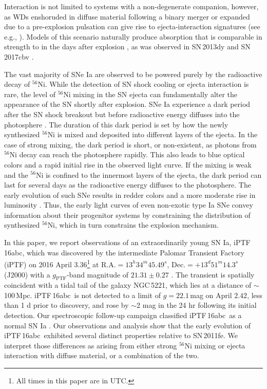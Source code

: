 \documentclass[twocolumn]{aastex61}
\newcommand{\abc}{iPTF\,16abc}
\begin{document}
Interaction is not limited to systems with a non-degenerate companion, however, as WDs enshoruded in diffuse material following a binary merger or expanded due to a pre-explosion pulsation can give rise to ejecta-interaction signatures (see e.g., \citealt{2014MNRAS.441..532D}). Models of this scenario naturally produce  absorption that is comparable in strength to  in the days after explosion \citep{2014MNRAS.441..532D}, as was observed in SN\,2013dy \citep{2013ApJ...778L..15Z} and SN\,2017cbv \citep{2017arXiv170608990H}.

The vast majority of SNe Ia are observed 
to be powered purely by the radioactive decay of $^{56}$Ni. 
While the detection of SN shock cooling or ejecta interaction is rare, the level of $^{56}$Ni mixing in the SN ejecta can fundamentally alter the appearance of the SN shortly after explosion. SNe Ia experience a dark period after
the SN shock breakout but before radioactive energy  
diffuses into the photosphere \citep{2014ApJ...784...85P}. The 
duration of this dark period is set by how the newly synthesized 
$^{56}$Ni is mixed and deposited into different layers of the ejecta. In the case of strong mixing, the dark period is short, or 
non-existent, as photons from $^{56}$Ni decay can reach the 
photosphere rapidly. This also leads to blue optical colors and a 
rapid initial rise in the observed light curve. If the mixing is 
weak and the $^{56}$Ni is confined to the innermost layers of the 
ejecta, the dark period can last for several days as the radioactive energy diffuses to the photosphere. The early evolution of such SNe results in redder colors and a more moderate rise in luminosity \citep{2016ApJ...826...96P}. Thus, the early light curves of even non-exotic type Ia SNe convey information about their progenitor systems by constraining the distribution of synthesized $^{56}$Ni, which in turn constrains the explosion mechanism.

In this paper, we report observations of an extraordinarily young SN Ia, \abc, which was discovered by the intermediate Palomar Transient Factory (iPTF) on 2016 April $3.36$\footnote{All times in this paper are in UTC.} at $\textrm{R.A.}=13^h34^m45.49^s$, $\textrm{Dec.}=+13^d51^m14.3^s$ (J2000) with a $g_\mathrm{PTF}$-band magnitude of $21.31\pm0.27$ \citep{2016ATel.8907....1M}. The transient is spatially coincident with a tidal tail of the galaxy NGC\,5221, which lies at a distance of $\sim$100\,Mpc. \abc\ is not detected to a limit of $g=22.1$\,mag on April $2.42$, less than 1 d prior to discovery, and rose by $\sim$2 mag in the 24 hr following its initial detection. Our spectroscopic follow-up
campaign classified \abc\ as a normal SN Ia
\citep{2016ATel.8909....1C}. Our observations and analysis show that the early evolution of \abc\ exhibited several distinct properties relative to SN\,2011fe. We interpret those differences as arising from either strong $^{56}$Ni mixing or ejecta interaction with diffuse material, or a combination of the two.
\end{document}

